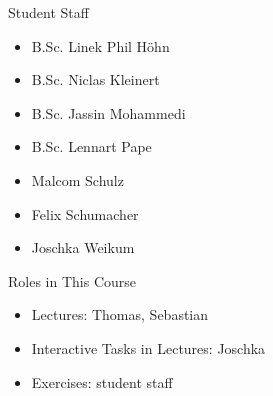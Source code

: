 \begin{frame}{\insertsubsection}
	\begin{fancycolumns}
		\begin{definition}{Student Staff}
			\begin{itemize}
				\item B.Sc. Linek Phil Höhn
				\item B.Sc. Niclas Kleinert
				\item B.Sc. Jassin Mohammedi
				\item B.Sc. Lennart Pape
				\item Malcom Schulz
				\item Felix Schumacher
				\item Joschka Weikum
			\end{itemize}
		\end{definition}
	\nextcolumn
		\begin{note}{Roles in This Course}
			\begin{itemize}
				\item Lectures: Thomas, Sebastian
				\item Interactive Tasks in Lectures: Joschka
				\item Exercises: student staff
			\end{itemize}
		\end{note}
	\end{fancycolumns}
\end{frame}
